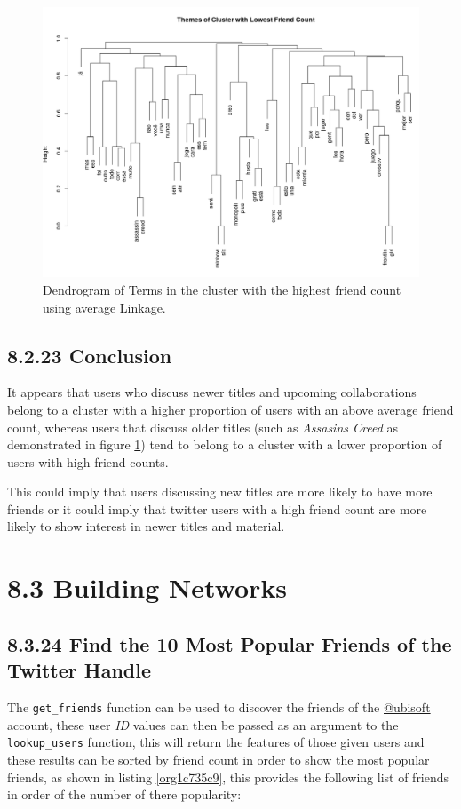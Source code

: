\documentclass[11pt]{article}
\begin{document}
\begin{figure}[htbp]
\centering
\includegraphics[width=12cm]{./Figures/LowDend.png}
\caption{\label{fig:orgd0adda1}Dendrogram of Terms in the cluster with the highest friend count using average Linkage.}
\end{figure}

\subsection{8.2.23 Conclusion}
\label{sec:org49d5fd8}
It appears that users who discuss newer titles and upcoming collaborations belong to a cluster with a higher proportion of users with an above average friend count, whereas users that discuss older titles (such as \emph{Assasins Creed} as demonstrated in figure \ref{fig:orgd0adda1}) tend to belong to a cluster with a lower proportion of users with high friend counts.

This could imply that users discussing new titles are more likely to have more friends or it could imply that twitter users with a high friend count are more likely to show interest in newer titles and material.
\newpage
\section{8.3 Building Networks}
\label{sec:org26dcfa3}
\subsection{8.3.24 Find the 10 Most Popular Friends of the Twitter Handle}
\label{sec:orge247dab}
The \texttt{get\_friends} function can be used to discover the friends of the \href{https://twitter.com/Ubisoft}{@ubisoft}
account, these user \emph{ID} values can then be passed as an argument to the
\texttt{lookup\_users} function, this will return the features of those given users and
these results can be sorted by friend count in order to show the most popular
friends, as shown in listing \ref{org1c735c9}, this provides the following list of friends in
order of the number of there popularity:
\end{document}
